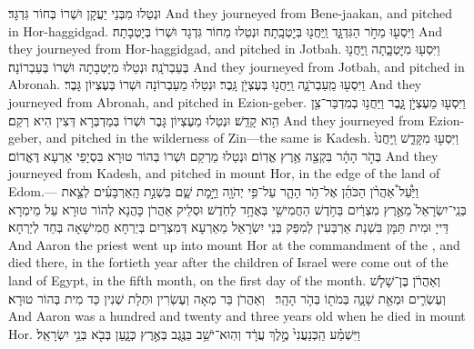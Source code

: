 {וּנְטַלוּ מִבְּנֵי יַעֲקָן וּשְׁרוֹ בְּחוֹר גִּדְגָּד׃}
{And they journeyed from Bene-jaakan, and pitched in Hor-haggidgad.}{}
{וַיִּסְע֖וּ מֵחֹ֣ר הַגִּדְגָּ֑ד וַֽיַּחֲנ֖וּ בְּיׇטְבָֽתָה׃}
{וּנְטַלוּ מֵחוֹר גִּדְגָד וּשְׁרוֹ בְּיָטְבָתָה׃}
{And they journeyed from Hor-haggidgad, and pitched in Jotbah.}{}
{וַיִּסְע֖וּ מִיׇּטְבָ֑תָה וַֽיַּחֲנ֖וּ בְּעַבְרֹנָֽה׃}
{וּנְטַלוּ מִיָּטְבָתָה וּשְׁרוֹ בְּעַבְרוֹנָה׃}
{And they journeyed from Jotbah, and pitched in Abronah.}{}
{וַיִּסְע֖וּ מֵֽעַבְרֹנָ֑ה וַֽיַּחֲנ֖וּ בְּעֶצְיֹ֥ן גָּֽבֶר׃}
{וּנְטַלוּ מֵעַבְרוֹנָה וּשְׁרוֹ בְּעֶצְיוֹן גָּבֶר׃}
{And they journeyed from Abronah, and pitched in Ezion-geber.}{}
{וַיִּסְע֖וּ מֵעֶצְיֹ֣ן גָּ֑בֶר וַיַּחֲנ֥וּ בְמִדְבַּר־צִ֖ן הִ֥וא קָדֵֽשׁ׃}
{וּנְטַלוּ מֵעֶצְיוֹן גָּבֶר וּשְׁרוֹ בְּמַדְבְּרָא דְּצִין הִיא רְקַם׃}
{And they journeyed from Ezion-geber, and pitched in the wilderness of Zin—the same is Kadesh.}{}
{וַיִּסְע֖וּ מִקָּדֵ֑שׁ וַֽיַּחֲנוּ֙ בְּהֹ֣ר הָהָ֔ר בִּקְצֵ֖ה אֶ֥רֶץ אֱדֽוֹם׃}
{וּנְטַלוּ מֵרְקַם וּשְׁרוֹ בְּהוֹר טוּרָא בִּסְיָפֵי אַרְעָא דֶּאֱדוֹם׃}
{And they journeyed from Kadesh, and pitched in mount Hor, in the edge of the land of Edom.—}{}
{וַיַּ֩עַל֩ אַהֲרֹ֨ן הַכֹּהֵ֜ן אֶל־הֹ֥ר הָהָ֛ר עַל־פִּ֥י יְהֹוָ֖ה וַיָּ֣מׇת שָׁ֑ם בִּשְׁנַ֣ת הָֽאַרְבָּעִ֗ים לְצֵ֤את בְּנֵֽי־יִשְׂרָאֵל֙ מֵאֶ֣רֶץ מִצְרַ֔יִם בַּחֹ֥דֶשׁ הַחֲמִישִׁ֖י בְּאֶחָ֥ד לַחֹֽדֶשׁ׃
}
{וּסְלֵיק אַהֲרֹן כָּהֲנָא לְהוֹר טוּרָא עַל מֵימְרָא דַּייָ וּמִית תַּמָּן בִּשְׁנַת אַרְבְּעִין לְמִפַּק בְּנֵי יִשְׂרָאֵל מֵאַרְעָא דְּמִצְרַיִם בְּיַרְחָא חֲמִישָׁאָה בְּחַד לְיַרְחָא׃}
{And Aaron the priest went up into mount Hor at the commandment of the \lord, and died there, in the fortieth year after the children of Israel were come out of the land of Egypt, in the fifth month, on the first day of the month.}{}
{וְאַהֲרֹ֔ן בֶּן־שָׁלֹ֧שׁ וְעֶשְׂרִ֛ים וּמְאַ֖ת שָׁנָ֑ה בְּמֹת֖וֹ בְּהֹ֥ר הָהָֽר׃ \setuma }
{וְאַהֲרֹן בַּר מְאָה וְעֶשְׂרִין וּתְלָת שְׁנִין כַּד מִית בְּהוֹר טוּרָא׃}
{And Aaron was a hundred and twenty and three years old when he died in mount Hor.}{}
{וַיִּשְׁמַ֗ע הַֽכְּנַעֲנִי֙ מֶ֣לֶךְ עֲרָ֔ד וְהֽוּא־יֹשֵׁ֥ב בַּנֶּ֖גֶב בְּאֶ֣רֶץ כְּנָ֑עַן בְּבֹ֖א בְּנֵ֥י יִשְׂרָאֵֽל׃
}
